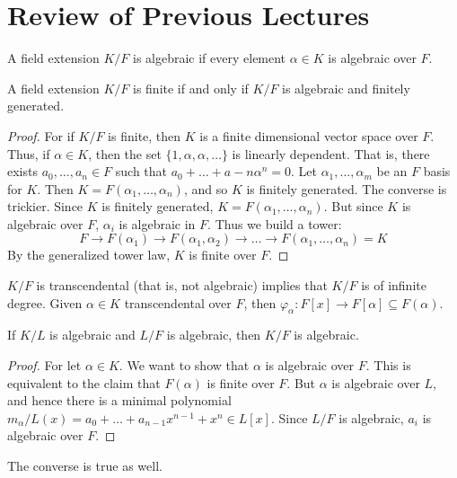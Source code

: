 \section{Review of Previous Lectures}
    A field extension $K/F$ is algebraic if every element $\alpha\in{K}$ is
    algebraic over $F$.
    \begin{theorem}
        A field extension $K/F$ is finite if and only if $K/F$ is algebraic
        and finitely generated.
    \end{theorem}
    \begin{proof}
        For if $K/F$ is finite, then $K$ is a finite dimensional vector
        space over $F$. Thus, if $\alpha\in{K}$, then the set
        $\{1,\alpha,\alpha,\dots\}$ is linearly dependent. That is, there
        exists $a_{0},\dots,a_{n}\in{F}$ such that
        $a_{0}+\dots+a-{n}\alpha^{n}=0$. Let $\alpha_{1},\dots,\alpha_{m}$
        be an $F$ basis for $K$. Then $K=F(\alpha_{1},\dots,\alpha_{n})$,
        and so $K$ is finitely generated. The converse is trickier. Since
        $K$ is finitely generated, $K=F(\alpha_{1},\dots,\alpha_{n})$. But
        since $K$ is algebraic over $F$, $\alpha_{i}$ is algebraic in $F$.
        Thus we build a tower:
        \begin{equation}
            F\rightarrow{F}(\alpha_{1})\rightarrow{F}(\alpha_{1},\alpha_{2})
                \rightarrow\dots\rightarrow{F}(\alpha_{1},\dots,\alpha_{n})
                =K
        \end{equation}
        By the generalized tower law, $K$ is finite over $F$.
    \end{proof}
    $K/F$ is transcendental (that is, not algebraic) implies that $K/F$ is
    of infinite degree. Given $\alpha\in{K}$ transcendental over $F$, then
    $\varphi_{\alpha}:F[x]\rightarrow{F}[\alpha]\subseteq{F}(\alpha)$.
    \begin{theorem}
        If $K/L$ is algebraic and $L/F$ is algebraic, then $K/F$ is
        algebraic.
    \end{theorem}
    \begin{proof}
        For let $\alpha\in{K}$. We want to show that $\alpha$ is algebraic
        over $F$. This is equivalent to the claim that $F(\alpha)$ is finite
        over $F$. But $\alpha$ is algebraic over $L$, and hence there is a
        minimal polynomial
        $m_{\alpha}/L(x)=a_{0}+\dots+a_{n-1}x^{n-1}+x^{n}\in{L}[x]$. Since
        $L/F$ is algebraic, $a_{i}$ is algebraic over $F$.
    \end{proof}
    The converse is true as well.
